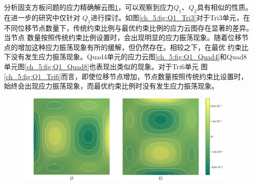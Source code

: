 分析固支方板问题的应力精确解云图\ref{ch_5:fig:plate_exact_solution}，可以观察到应力$Q_1$、$Q_2$具有相似的性质。在进一步的研究中仅针对
$Q_1$进行探讨。如图\ref{ch_5:fig:Q1_Tri3}对于Tri3单元，在不同位移节点数量下，传统约束比例与最优约束比例的应力云图存在显著的差异。当节点
数量按照传统约束比例设置时，会出现明显的应力振荡现象。随着位移节点的增加这种应力振荡现象有所的缓解，但仍然存在。相较之下，在最优
约束比下没有发生应力振荡现象。Quad4单元的应力云图\ref{ch_5:fig:Q1_Quad4}和Quad8单元图\ref{ch_5:fig:Q1_Quad8}也表现出类似的现象。对于Tri6单元
图\ref{ch_5:fig:Q1_Tri6}而言，即使位移节点增加，节点数量按照传统约束比设置时，始终会出现应力振荡现象，而最优约束比例时没有发生应力振荡现象。
\begin{figure}[!h]
    \centering
    \begin{subcaptiongroup}
    \includegraphics[width=0.46\textwidth]{figures/shearlocking/plate_exactQ1_solution.png}
    \includegraphics[width=0.49\textwidth]{figures/shearlocking/plate_exactQ2_solution.png}
    \end{subcaptiongroup}
\caption{}
\label{ch_5:fig:plate_exact_solution}
\end{figure}


